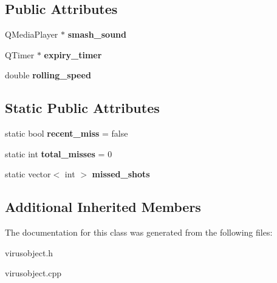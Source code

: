 \subsection*{Public Attributes}
\begin{DoxyCompactItemize}
\item 
\mbox{\label{classVirusObject_a90c989c71463003b8e69ccfbb5e8be62}} 
Q\+Media\+Player $\ast$ {\bfseries smash\+\_\+sound}
\item 
\mbox{\label{classVirusObject_a98f835b19e1ab22a79d1322ba5c6be07}} 
Q\+Timer $\ast$ {\bfseries expiry\+\_\+timer}
\item 
\mbox{\label{classVirusObject_a2d25a4fa8fc71cdc4b68936e8f578b21}} 
double {\bfseries rolling\+\_\+speed}
\end{DoxyCompactItemize}
\subsection*{Static Public Attributes}
\begin{DoxyCompactItemize}
\item 
\mbox{\label{classVirusObject_a02fb079085e3880476a7aec592f999cb}} 
static bool {\bfseries recent\+\_\+miss} = false
\item 
\mbox{\label{classVirusObject_a4995134404253ee91b388a30909265d6}} 
static int {\bfseries total\+\_\+misses} = 0
\item 
\mbox{\label{classVirusObject_a01a7bcc32a9798d84d54c38f23a23add}} 
static vector$<$ int $>$ {\bfseries missed\+\_\+shots}
\end{DoxyCompactItemize}
\subsection*{Additional Inherited Members}


The documentation for this class was generated from the following files\+:\begin{DoxyCompactItemize}
\item 
virusobject.\+h\item 
virusobject.\+cpp\end{DoxyCompactItemize}
